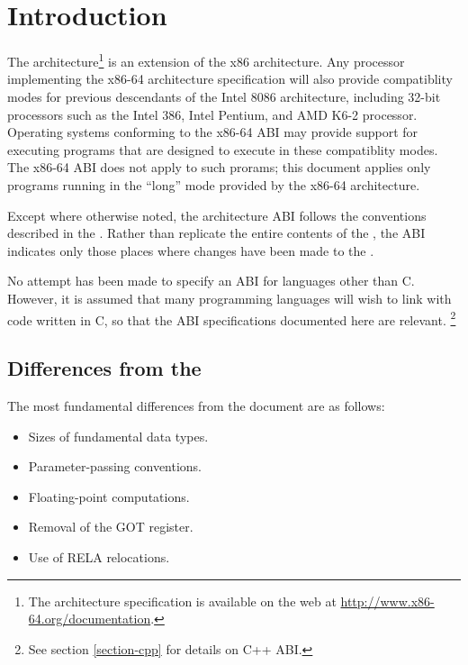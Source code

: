 \chapter{Introduction}

The \xARCH architecture\footnote{The architecture specification is
  available on the web at \url{http://www.x86-64.org/documentation}.} is an
extension of the x86 architecture.  Any processor implementing the
x86-64 architecture specification will also provide compatiblity modes
for previous descendants of the Intel 8086 architecture, including
32-bit processors such as the Intel 386, Intel Pentium, and AMD K6-2
processor.  Operating systems conforming to the x86-64 ABI may provide
support for executing programs that are designed to execute in these
compatiblity modes.  The x86-64 ABI does not apply to such prorams;
this document applies only programs running in the ``long'' mode
provided by the x86-64 architecture.

Except where otherwise noted, the \xARCH architecture ABI follows the
conventions described in the \intelabi.  Rather than replicate the
entire contents of the \intelabi, the \xARCH ABI indicates only those
places where changes have been made to the \intelabi.

No attempt has been made to specify an ABI for languages other than C.
However, it is assumed that many programming languages will wish to
link with code written in C, so
that the ABI specifications documented here are relevant.%
\footnote{See section \ref{section-cpp} for details on C++ ABI.}

\section{Differences from the \intelabi}

The most fundamental differences from the \intelabi document
are as follows:
\begin{itemize}
\item Sizes of fundamental data types.
\item Parameter-passing conventions.
\item Floating-point computations.
\item Removal of the GOT register.
\item Use of RELA relocations.
\end{itemize}

